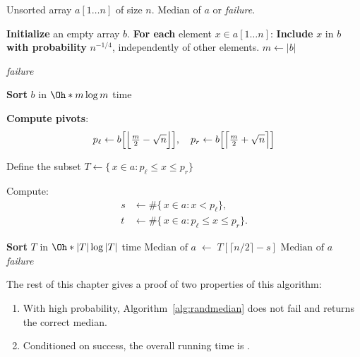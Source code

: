 \begin{algorithm}
    \caption{RandMedian: Randomized Median Algorithm}
    \label{alg:randmedian}
    \begin{algorithmic}[1]
    \Require Unsorted array \( a[1 \dots n] \) of size \( n \).
    \Ensure Median of \( a \) or \emph{failure}.
    
    \State \textbf{Initialize} an empty array \(b\).
    \State \textbf{For each} element \(x \in a[1 \dots n]\):
    \Statex \quad \textbf{Include} \(x\) in \(b\) \textbf{with probability} \(n^{-1/4}\), independently of other elements.
    \State \( m \gets |b| \) 

        \State \Return \emph{failure}
    \EndIf

    \State \textbf{Sort} \( b \) in \(\Oh*{m \log m}\) time
    
    \State \textbf{Compute pivots}:
    \[
      p_\ell \gets b\Bigl[\Bigl\lfloor \tfrac{m}{2} - \sqrt{n} \Bigr\rfloor\Bigr], 
      \quad
      p_r \gets b\Bigl[\Bigl\lceil \tfrac{m}{2} + \sqrt{n} \Bigr\rceil\Bigr]
    \]
    
    \State Define the subset \( T \gets \{\, x \in a : p_\ell \le x \le p_r \}\)
    
    \State Compute:
    \begin{align*}
        s &\gets \#\{\, x \in a : x < p_\ell \},\\
        t &\gets \#\{\, x \in a : p_\ell \le x \le p_r \}.
    \end{align*}
    
     \label{alg:randmedian:check}
        \State \textbf{Sort} \( T \) in \(\Oh*{|T|\log |T|}\) time
        \State \(\text{Median of } a \;\gets\; T[\lceil n/2 \rceil - s]\)
        \State \Return \(\text{Median of } a\)
    \Else
        \State \Return \emph{failure}
    \EndIf
    \end{algorithmic}
    \end{algorithm}
    

The rest of this chapter gives a proof of two properties of this algorithm:
\begin{enumerate}
    \item With high probability, Algorithm~\ref{alg:randmedian} does not fail and returns the correct median.
    \item Conditioned on success, the overall running time is .
\end{enumerate}

